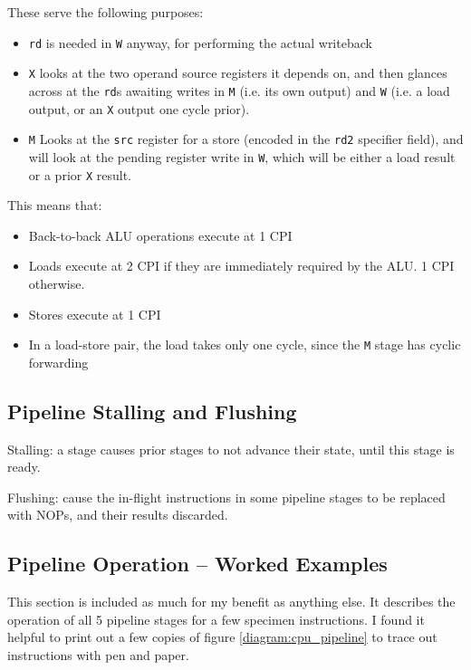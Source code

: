 \documentclass{article}
\begin{document}
These serve the following purposes:

\begin{itemize}
	\item \texttt{rd} is needed in \texttt{W} anyway, for performing the actual writeback
	\item \texttt{X} looks at the two operand source registers it depends on, and then glances across at the \texttt{rd}s awaiting writes in \texttt{M} (i.e. its own output) and \texttt{W} (i.e. a load output, or an \texttt{X} output one cycle prior).
	\item \texttt{M} Looks at the \texttt{src} register for a store (encoded in the \texttt{rd2} specifier field), and will look at the pending register write in \texttt{W}, which will be either a load result or a prior \texttt{X} result.
\end{itemize}

This means that:
\begin{itemize}
	\item Back-to-back ALU operations execute at 1 CPI
	\item Loads execute at 2 CPI if they are immediately required by the ALU. 1 CPI otherwise.
	\item Stores execute at 1 CPI
	\item In a load-store pair, the load takes only one cycle, since the \texttt{M} stage has cyclic forwarding
\end{itemize}

\subsection{Pipeline Stalling and Flushing}

Stalling: a stage causes prior stages to not advance their state, until this stage is ready.

Flushing: cause the in-flight instructions in some pipeline stages to be replaced with NOPs, and their results discarded.




\subsection{Pipeline Operation -- Worked Examples}

This section is included as much for my benefit as anything else. It describes the operation of all 5 pipeline stages for a few specimen instructions. I found it helpful to print out a few copies of figure \ref{diagram:cpu_pipeline} to trace out instructions with pen and paper.
\end{document}
